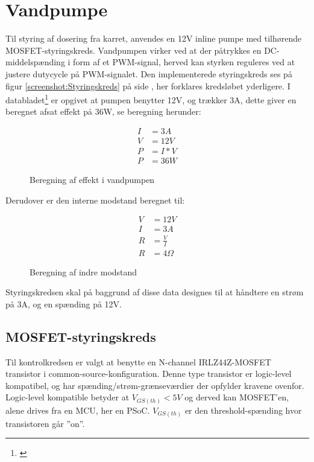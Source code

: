 
\section{Vandpumpe}
Til styring af dosering fra karret, anvendes en 12V inline pumpe  med tilhørende MOSFET-styringskreds. 
Vandpumpen virker ved at der påtrykkes en DC-middelspænding i form af et PWM-signal, herved kan styrken reguleres ved at justere dutycycle på PWM-signalet.
Den implementerede styringskreds ses på figur \ref{screenshot:Styringskreds} på side \pageref{screenshot:Styringskreds}, her forklares kredsløbet yderligere.
I databladet\footnote{\citet{biltema:inlinepump}} er opgivet at pumpen benytter 12V, og trækker 3A, dette giver en beregnet afsat effekt på 36W, se beregning herunder:

\begin{figure}[!h]
    \begin{align*}
        I &= 3 A \\ 
        V &= 12 V \\
        P &= I*V \\ 
        P &= 36W
    \end{align*}
\label{eq:PumpeA}
\caption{Beregning af effekt i vandpumpen}
\end{figure}

Derudover er den interne modstand beregnet til:

\begin{figure}[!h]
	\begin{align*}
   		V &= 12 V \\ 
        I &= 3 A \\
        R &= \frac{V}{I} \\ 
        R &= 4 \Omega
  	\end{align*}
\label{eq:pumpeOhm}
\caption{Beregning af indre modstand}
\end{figure}

Styringskredsen skal på baggrund af disse data designes til at håndtere en strøm på 3A, og en spænding på 12V. 


\newpage
\subsection{MOSFET-styringskreds}
Til kontrolkredsen er valgt at benytte en N-channel IRLZ44Z-MOSFET transistor i common-source-konfiguration. Denne type transistor er logic-level kompatibel, og har spænding/strøm-grænseværdier der opfylder kravene ovenfor.  
Logic-level kompatible betyder at $ V_{GS(th)} < 5V $ og derved kan MOSFET'en, alene drives fra en MCU, her en PSoC.
$ V_{GS(th)} $ er den threshold-spænding hvor transistoren går ”on”.


